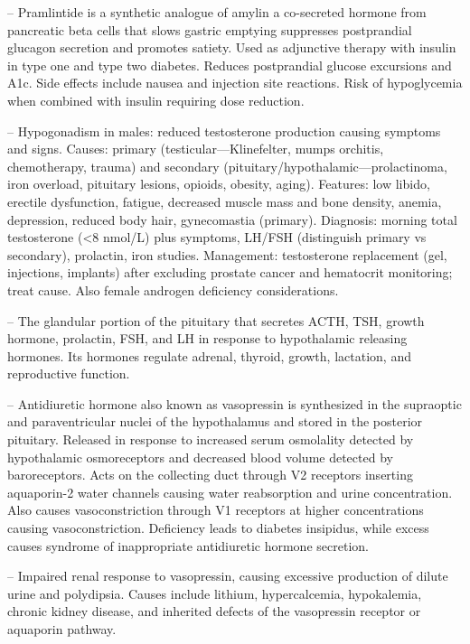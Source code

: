 -- Pramlintide is a synthetic analogue of amylin a co-secreted hormone from pancreatic beta cells that slows gastric emptying suppresses postprandial glucagon secretion and promotes satiety. Used as adjunctive therapy with insulin in type one and type two diabetes. Reduces postprandial glucose excursions and A1c. Side effects include nausea and injection site reactions. Risk of hypoglycemia when combined with insulin requiring dose reduction.

-- Hypogonadism in males: reduced testosterone production causing symptoms and signs. Causes: primary (testicular—Klinefelter, mumps orchitis, chemotherapy, trauma) and secondary (pituitary/hypothalamic—prolactinoma, iron overload, pituitary lesions, opioids, obesity, aging). Features: low libido, erectile dysfunction, fatigue, decreased muscle mass and bone density, anemia, depression, reduced body hair, gynecomastia (primary). Diagnosis: morning total testosterone (<8 nmol/L) plus symptoms, LH/FSH (distinguish primary vs secondary), prolactin, iron studies. Management: testosterone replacement (gel, injections, implants) after excluding prostate cancer and hematocrit monitoring; treat cause. Also female androgen deficiency considerations.

-- The glandular portion of the pituitary that secretes ACTH, TSH, growth hormone, prolactin, FSH, and LH in response to hypothalamic releasing hormones. Its hormones regulate adrenal, thyroid, growth, lactation, and reproductive function.

-- Antidiuretic hormone also known as vasopressin is synthesized in the supraoptic and paraventricular nuclei of the hypothalamus and stored in the posterior pituitary. Released in response to increased serum osmolality detected by hypothalamic osmoreceptors and decreased blood volume detected by baroreceptors. Acts on the collecting duct through V2 receptors inserting aquaporin-2 water channels causing water reabsorption and urine concentration. Also causes vasoconstriction through V1 receptors at higher concentrations causing vasoconstriction. Deficiency leads to diabetes insipidus, while excess causes syndrome of inappropriate antidiuretic hormone secretion.

-- Impaired renal response to vasopressin, causing excessive production of dilute urine and polydipsia. Causes include lithium, hypercalcemia, hypokalemia, chronic kidney disease, and inherited defects of the vasopressin receptor or aquaporin pathway.

